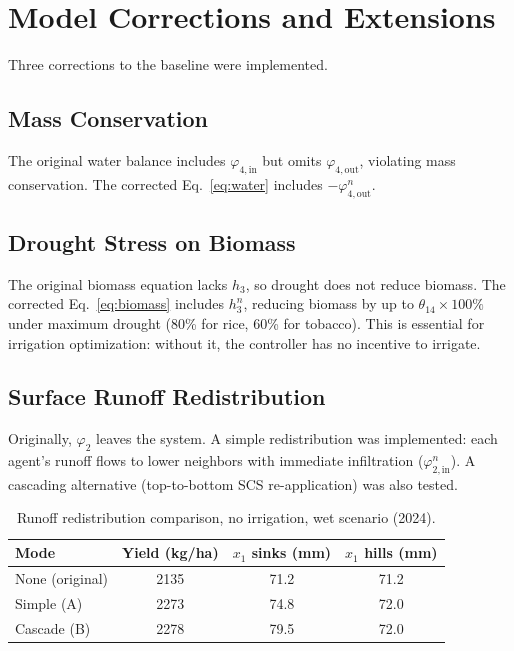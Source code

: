 \section{Model Corrections and Extensions}

Three corrections to the baseline \cite{Lopezjimenez2024} were implemented.

\subsection{Mass Conservation}

The original water balance includes $\varphi_{4,\text{in}}$ but omits $\varphi_{4,\text{out}}$, violating mass conservation. The corrected Eq.~\ref{eq:water} includes $-\varphi_{4,\text{out}}^n$.

\subsection{Drought Stress on Biomass}

The original biomass equation lacks $h_3$, so drought does not reduce biomass. The corrected Eq.~\ref{eq:biomass} includes $h_3^n$, reducing biomass by up to $\theta_{14} \times 100\%$ under maximum drought (80\% for rice, 60\% for tobacco). This is essential for irrigation optimization: without it, the controller has no incentive to irrigate.

\subsection{Surface Runoff Redistribution}
\label{sec:runoff}

Originally, $\varphi_2$ leaves the system. A simple redistribution was implemented: each agent's runoff flows to lower neighbors with immediate infiltration ($\varphi_{2,\text{in}}^n$). A cascading alternative (top-to-bottom SCS re-application) was also tested.

\begin{table}[H]
\centering
\caption{Runoff redistribution comparison, no irrigation, wet scenario (2024).}
\label{tab:runoff}
\begin{tabular}{lccc}
\toprule
\textbf{Mode} & \textbf{Yield (kg/ha)} & \textbf{$x_1$ sinks (mm)} & \textbf{$x_1$ hills (mm)} \\
\midrule
None (original) & 2135 & 71.2 & 71.2 \\
Simple (A) & 2273 & 74.8 & 72.0 \\
Cascade (B) & 2278 & 79.5 & 72.0 \\
\bottomrule
\end{tabular}
\end{table}

